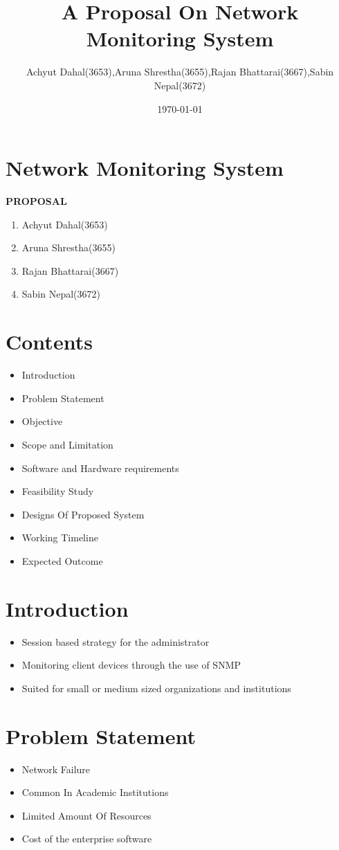 \documentclass[10pt,article,oneside]{memoir}
\author{Achyut Dahal(3653),Aruna Shrestha(3655),Rajan Bhattarai(3667),Sabin Nepal(3672)}
\date{\today}
\title{A Proposal On Network Monitoring System}
\begin{document}
\maketitle


\chapter*{\textbf{Network Monitoring System}}
\label{sec:orge3fc5d9}
\textbf{PROPOSAL}

\begin{enumerate}
\item Achyut Dahal(3653)
\item Aruna Shrestha(3655)
\item Rajan Bhattarai(3667)
\item Sabin Nepal(3672)
\end{enumerate}

\chapter*{Contents}
\label{sec:org838329f}
\begin{itemize}
\item Introduction
\item Problem Statement
\item Objective
\item Scope and Limitation
\item Software and Hardware requirements
\item Feasibility Study
\item Designs Of Proposed System
\item Working Timeline
\item Expected Outcome
\end{itemize}

\chapter*{Introduction}
\label{sec:orgef16918}
\begin{itemize}
\item Session based strategy for the administrator
\item Monitoring client devices through the use of SNMP
\item Suited for small or medium sized organizations and institutions
\end{itemize}

\chapter*{Problem Statement}
\label{sec:org9afa213}
\begin{itemize}
\item Network Failure
\item Common In Academic Institutions
\item Limited Amount Of Resources
\item Cost of the enterprise software
\end{itemize}
\end{document}
